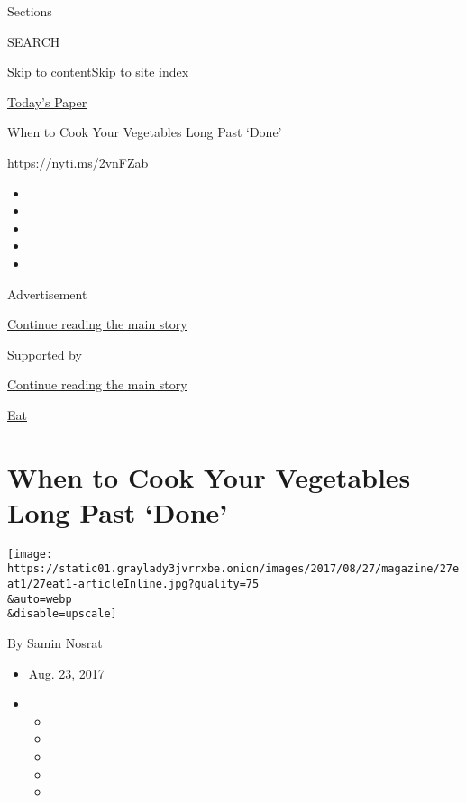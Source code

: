 Sections

SEARCH

\protect\hyperlink{site-content}{Skip to
content}\protect\hyperlink{site-index}{Skip to site index}

\href{https://myaccount.nytimes3xbfgragh.onion/auth/login?response_type=cookie\&client_id=vi}{}

\href{https://www.nytimes3xbfgragh.onion/section/todayspaper}{Today's
Paper}

When to Cook Your Vegetables Long Past `Done'

\url{https://nyti.ms/2vnFZab}

\begin{itemize}
\item
\item
\item
\item
\item
\end{itemize}

Advertisement

\protect\hyperlink{after-top}{Continue reading the main story}

Supported by

\protect\hyperlink{after-sponsor}{Continue reading the main story}

\href{/column/magazine-eat}{Eat}

\hypertarget{when-to-cook-your-vegetables-long-past-done}{%
\section{When to Cook Your Vegetables Long Past
`Done'}\label{when-to-cook-your-vegetables-long-past-done}}

\texttt{[image: https://static01.graylady3jvrrxbe.onion/images/2017/08/27/magazine/27eat1/27eat1-articleInline.jpg?quality=75\\\&auto=webp\\\&disable=upscale]}

By Samin Nosrat

\begin{itemize}
\item
  Aug. 23, 2017
\item
  \begin{itemize}
  \item
  \item
  \item
  \item
  \item
  \end{itemize}
\end{itemize}

